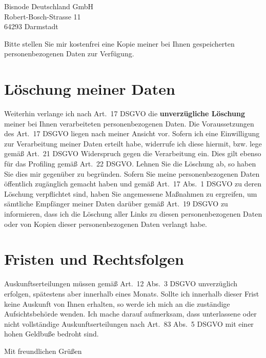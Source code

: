 \documentclass[a4paper,DIV=11]{scrartcl}
\begin{document}
\begin{letter}{%

Bisnode Deutschland GmbH\\
Robert-Bosch-Strasse 11\\
64293 Darmstadt
}
Bitte stellen Sie mir kostenfrei eine Kopie meiner bei Ihnen gespeicherten personenbezogenen Daten zur Verfügung.

\section{Löschung meiner Daten}

Weiterhin verlange ich nach Art.\ 17 DSGVO die \textbf{unverzügliche Löschung} meiner bei Ihnen verarbeiteten personenbezogenen Daten.
Die Voraussetzungen des Art.\ 17 DSGVO liegen nach meiner Ansicht vor. Sofern ich eine Einwilligung zur Verarbeitung meiner Daten erteilt habe, widerrufe ich diese hiermit, bzw. lege gemäß Art.\ 21 DSGVO Widerspruch gegen die Verarbeitung ein. Dies gilt ebenso für das Profiling gemäß Art.\ 22 DSGVO. Lehnen Sie die Löschung ab, so haben Sie dies mir gegenüber zu begründen.
Sofern Sie meine personenbezogenen Daten öffentlich zugänglich gemacht haben und gemäß Art.\ 17 Abs.\ 1 DSGVO zu deren Löschung verpflichtet sind, haben Sie angemessene Maßnahmen zu ergreifen, um sämtliche Empfänger meiner Daten darüber gemäß Art.\ 19 DSGVO zu informieren, dass ich die Löschung aller Links zu diesen personenbezogenen Daten oder von Kopien dieser personenbezogenen Daten verlangt habe.


\section{Fristen und Rechtsfolgen}

Auskunftserteilungen müssen gemäß Art.\ 12 Abs.\ 3 DSGVO unverzüglich erfolgen, spätestens aber innerhalb eines Monats. Sollte ich innerhalb dieser Frist keine Auskunft von Ihnen erhalten, so werde ich mich an die zuständige Aufsichtsbehörde wenden. Ich mache darauf aufmerksam, dass unterlassene oder nicht vollständige Auskunftserteilungen nach Art.\ 83 Abs.\ 5 DSGVO mit einer hohen Geldbuße bedroht sind.


\closing{Mit freundlichen Grüßen}

\end{letter}
\end{document}

